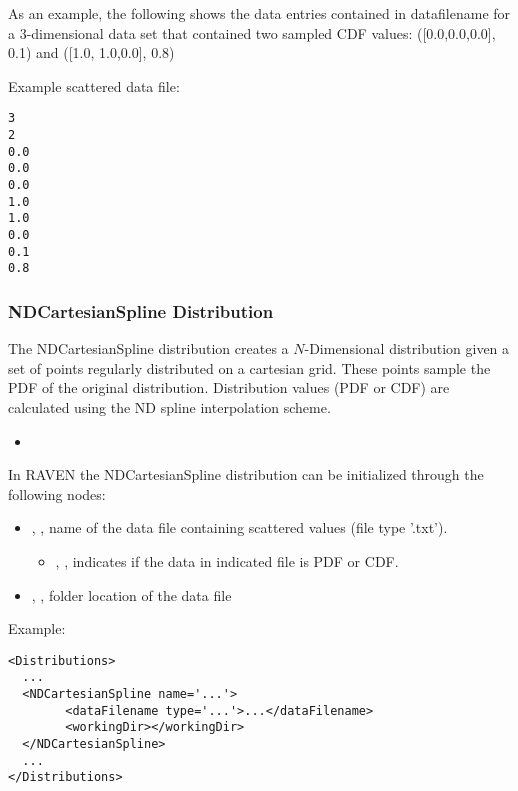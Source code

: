 As an example, the following shows the data entries contained in data\textunderscore filename for a 3-dimensional data set that contained two sampled CDF values: ([0.0,0.0,0.0], 0.1) and ([1.0, 1.0,0.0], 0.8)

Example scattered data file:
\begin{lstlisting}
3
2
0.0
0.0
0.0
1.0
1.0
0.0
0.1
0.8
\end{lstlisting}

\subsubsection{NDCartesianSpline Distribution}
\label{NDCartesianSpline}

The NDCartesianSpline distribution creates a $N$-Dimensional distribution given a set of points
regularly distributed on a cartesian grid. These points sample the PDF of the original distribution.
Distribution values (PDF or CDF) are calculated using the ND spline
interpolation scheme.


%
\attrsIntro
\vspace{-5mm}
\begin{itemize}
\itemsep0em
\item \nameDescription
\end{itemize}
\vspace{-5mm}


In RAVEN the NDCartesianSpline distribution can be initialized through the following nodes:
\begin{itemize}
\item {}, ,  name of the data file containing scattered values (file type '.txt').
\begin{itemize}
\item {}, , indicates if the data in indicated file is PDF or CDF.
\end{itemize}
\item {}, , folder location of the data file
\end{itemize}

Example:
\begin{lstlisting}[style=XML]
<Distributions>
  ...
  <NDCartesianSpline name='...'>
        <dataFilename type='...'>...</dataFilename>
        <workingDir></workingDir>
  </NDCartesianSpline>
  ...
</Distributions>
\end{lstlisting}

